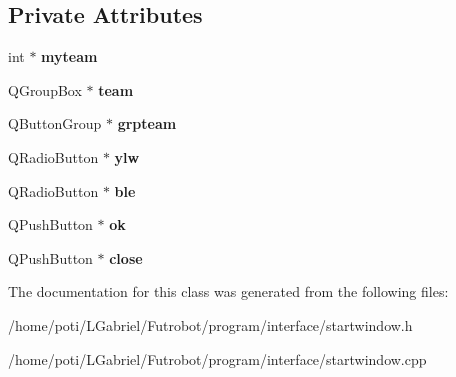 \subsection*{Private Attributes}
\begin{DoxyCompactItemize}
\item 
int $\ast$ {\bfseries myteam}\hypertarget{classStartWindow_a8c404c1a23453f40da5d953e85e3c994}{}\label{classStartWindow_a8c404c1a23453f40da5d953e85e3c994}

\item 
Q\+Group\+Box $\ast$ {\bfseries team}\hypertarget{classStartWindow_ad7f2911d99cf1c3099d59088864db81c}{}\label{classStartWindow_ad7f2911d99cf1c3099d59088864db81c}

\item 
Q\+Button\+Group $\ast$ {\bfseries grpteam}\hypertarget{classStartWindow_a4f2ac3dab95dba0b194a3e40b154769f}{}\label{classStartWindow_a4f2ac3dab95dba0b194a3e40b154769f}

\item 
Q\+Radio\+Button $\ast$ {\bfseries ylw}\hypertarget{classStartWindow_a44857f8baf5de5eab0dddd56d88e493f}{}\label{classStartWindow_a44857f8baf5de5eab0dddd56d88e493f}

\item 
Q\+Radio\+Button $\ast$ {\bfseries ble}\hypertarget{classStartWindow_aa71d43b2c9c5addabdc7cd59d7d4663d}{}\label{classStartWindow_aa71d43b2c9c5addabdc7cd59d7d4663d}

\item 
Q\+Push\+Button $\ast$ {\bfseries ok}\hypertarget{classStartWindow_ae24b01ca4e8319561e9e40c9aa7f544b}{}\label{classStartWindow_ae24b01ca4e8319561e9e40c9aa7f544b}

\item 
Q\+Push\+Button $\ast$ {\bfseries close}\hypertarget{classStartWindow_af4586b41b5beb2e1e95e6f886c787511}{}\label{classStartWindow_af4586b41b5beb2e1e95e6f886c787511}

\end{DoxyCompactItemize}


The documentation for this class was generated from the following files\+:\begin{DoxyCompactItemize}
\item 
/home/poti/\+L\+Gabriel/\+Futrobot/program/interface/startwindow.\+h\item 
/home/poti/\+L\+Gabriel/\+Futrobot/program/interface/startwindow.\+cpp\end{DoxyCompactItemize}
